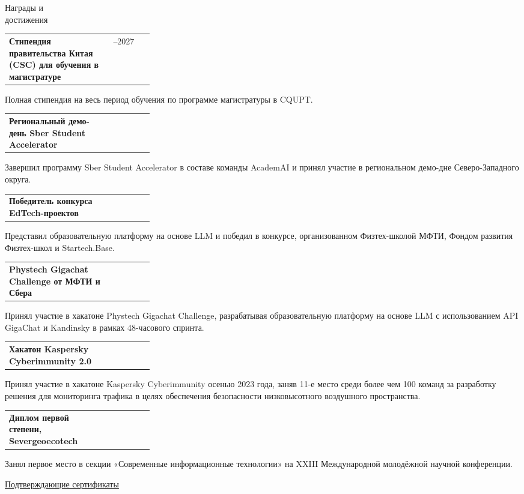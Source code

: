 \documentclass[11pt,a4paper]{article}
\makeatletter
\newcommand{\cvrow}[2]{%
  \noindent
  \begin{minipage}[t]{0.145\textwidth}
    \vspace{0pt}%
    \raggedright
    \fontsize{10.5}{12.5}\selectfont
    #1
  \end{minipage}%
  \hfill
  \begin{minipage}[t]{0.835\textwidth}
    \vspace{0pt}%
    #2
  \end{minipage}\par
}
\newcommand{\entry}[2]{%
  \begin{tabularx}{\linewidth}{@{}X >{\raggedleft\arraybackslash}p{0.28\linewidth}@{}}
    #1 & #2
  \end{tabularx}
}
\makeatother
\begin{document}
\cvrow{Награды и\\достижения}{%
  \entry
    {\textbf{Стипендия правительства Китая (CSC) для обучения в магистратуре}}
    {2024--2027}
  Полная стипендия на весь период обучения по программе магистратуры в CQUPT.

  \vspace{0.45em}
  \entry
    {\textbf{Региональный демо-день Sber Student Accelerator}}
    {2023}
  Завершил программу Sber Student Accelerator в составе команды AcademAI
  и принял участие в региональном демо-дне Северо-Западного округа.

  \vspace{0.45em}
  \entry
    {\textbf{Победитель конкурса EdTech-проектов}}
    {2023}
  Представил образовательную платформу на основе LLM и победил в конкурсе,
  организованном Физтех-школой МФТИ, Фондом развития Физтех-школ
  и Startech.Base.

  \vspace{0.45em}
  \entry
    {\textbf{Phystech Gigachat Challenge от МФТИ и Сбера}}
    {2023}
  Принял участие в хакатоне Phystech Gigachat Challenge, разрабатывая
  образовательную платформу на основе LLM с использованием API GigaChat
  и Kandinsky в рамках 48-часового спринта.

  \vspace{0.45em}
  \entry{\textbf{Хакатон Kaspersky Cyberimmunity 2.0}}
  {2023}
  Принял участие в хакатоне Kaspersky Cyberimmunity осенью 2023 года,
  заняв 11-е место среди более чем 100 команд за разработку решения
  для мониторинга трафика в целях обеспечения безопасности
  низковысотного воздушного пространства.

  \vspace{0.45em}
  \entry
    {\textbf{Диплом первой степени, Severgeoecotech}}
    {2022}
  Занял первое место в секции «Современные информационные технологии»
  на XXIII Международной молодёжной научной конференции.

  \vspace{0.3em}
  \href{https://iasenovets.github.io/files/certificates_selected_en_public_ready_v2.pdf}
       {\small Подтверждающие сертификаты}
}
\end{document}
